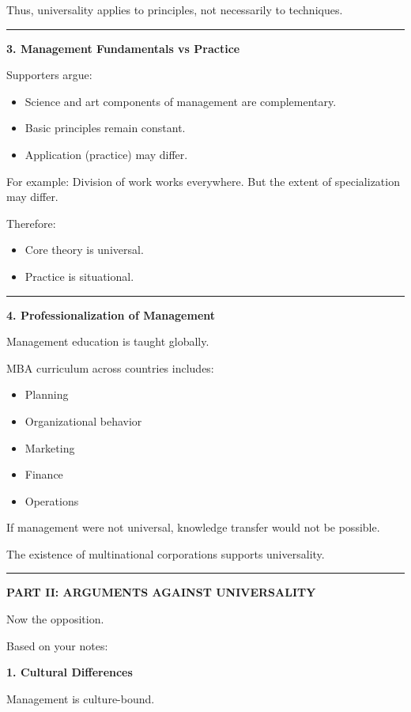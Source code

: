 \documentclass[10pt,a4paper]{article}
\newcommand{\separator}{\vspace{0.4em}\noindent\rule{\linewidth}{0.6pt}\vspace{0.4em}}
\begin{document}
Thus, universality applies to principles, not necessarily to techniques.

\separator

\textbf{3. Management Fundamentals vs Practice}

Supporters argue:
\begin{itemize}
  \item Science and art components of management are complementary.
  \item Basic principles remain constant.
  \item Application (practice) may differ.
\end{itemize}

For example: Division of work works everywhere. But the extent of specialization may differ.

Therefore:
\begin{itemize}
  \item Core theory is universal.
  \item Practice is situational.
\end{itemize}

\separator

\textbf{4. Professionalization of Management}

Management education is taught globally.

MBA curriculum across countries includes:
\begin{itemize}
  \item Planning
  \item Organizational behavior
  \item Marketing
  \item Finance
  \item Operations
\end{itemize}

If management were not universal, knowledge transfer would not be possible.

The existence of multinational corporations supports universality.

\separator

\begin{center}
  \large\textbf{PART II: ARGUMENTS AGAINST UNIVERSALITY}
\end{center}

Now the opposition.

Based on your notes:

\textbf{1. Cultural Differences}

Management is culture-bound.
\end{document}
